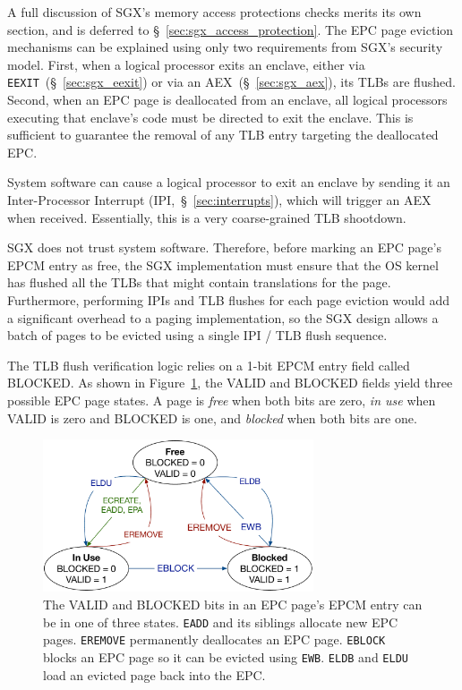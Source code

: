 A full discussion of SGX's memory access protections checks merits its own
section, and is deferred to \S~\ref{sec:sgx_access_protection}. The EPC page
eviction mechanisms can be explained using only two requirements from SGX's
security model. First, when a logical processor exits an enclave, either via
\texttt{EEXIT}~(\S~\ref{sec:sgx_eexit}) or via an AEX~(\S~\ref{sec:sgx_aex}),
its TLBs are flushed. Second, when an EPC page is deallocated from an enclave,
all logical processors executing that enclave's code must be directed to exit
the enclave. This is sufficient to guarantee the removal of any TLB entry
targeting the deallocated EPC.

System software can cause a logical processor to exit an enclave by sending it
an Inter-Processor Interrupt (IPI,~\S~\ref{sec:interrupts}), which will trigger
an AEX when received. Essentially, this is a very coarse-grained TLB shootdown.

SGX does not trust system software. Therefore, before marking an EPC page's
EPCM entry as free, the SGX implementation must ensure that the OS kernel has
flushed all the TLBs that might contain translations for the page. Furthermore,
performing IPIs and TLB flushes for each page eviction would add a significant
overhead to a paging implementation, so the SGX design allows a batch of pages
to be evicted using a single IPI / TLB flush sequence.


The TLB flush verification logic relies on a 1-bit EPCM entry field called
BLOCKED. As shown in Figure~\ref{fig:sgx_page_states}, the VALID and BLOCKED
fields yield three possible EPC page states. A page is \textit{free} when both
bits are zero, \textit{in use} when VALID is zero and BLOCKED is one, and
\textit{blocked} when both bits are one.

\begin{figure}[hbt]
  \centering
  \includegraphics[width=80mm]{figures/sgx_page_states.pdf}
  \caption{
    The VALID and BLOCKED bits in an EPC page's EPCM entry can be in one of
    three states. \texttt{EADD} and its siblings allocate new EPC pages.
    \texttt{EREMOVE} permanently deallocates an EPC page. \texttt{EBLOCK}
    blocks an EPC page so it can be evicted using \texttt{EWB}. \texttt{ELDB}
    and \texttt{ELDU} load an evicted page back into the EPC.
  }
  \label{fig:sgx_page_states}
\end{figure}

